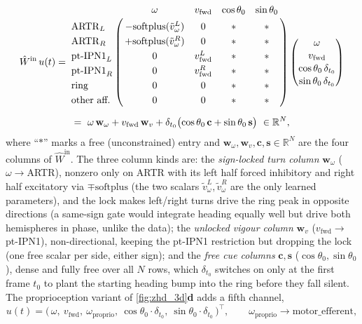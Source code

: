 \documentclass[11pt]{article}
\def\R{\mathbb{R}}
\def\softplus{\mathrm{softplus}}
\begin{document}
{\small
\begin{equation}
\begin{gathered}
\hat W^{\mathrm{in}}\,u(t)=
\bordermatrix{%
 & \omega & v_{\mathrm{fwd}} & \cos\theta_0 & \sin\theta_0 \cr
\mathrm{ARTR}_L   & -\softplus(\tilde v_\omega^{L}) & 0 & * & * \cr
\mathrm{ARTR}_R   & +\softplus(\tilde v_\omega^{R}) & 0 & * & * \cr
\text{pt-IPN1}_L  & 0 & v_{\mathrm{fwd}}^{L} & * & * \cr
\text{pt-IPN1}_R  & 0 & v_{\mathrm{fwd}}^{R} & * & * \cr
\text{ring}       & 0 & 0 & * & * \cr
\text{other aff.} & 0 & 0 & * & * \cr}
\begin{pmatrix}\omega\\[1pt] v_{\mathrm{fwd}}\\[1pt]
   \cos\theta_0\,\delta_{t_0}\\[1pt] \sin\theta_0\,\delta_{t_0}\end{pmatrix}
\\[6pt]
=\ \omega\,\mathbf{w}_\omega+v_{\mathrm{fwd}}\,\mathbf{w}_{v}
  +\delta_{t_0}\bigl(\cos\theta_0\,\mathbf{c}+\sin\theta_0\,\mathbf{s}\bigr)
  \ \in\R^{N},
\end{gathered}
\label{eq:zhd_swim_gate}
\end{equation}
}
where ``$*$'' marks a free (unconstrained) entry and
$\mathbf{w}_\omega,\mathbf{w}_{v},\mathbf{c},\mathbf{s}\in\R^{N}$ are
the four columns of $\hat W^{\mathrm{in}}$. The three column kinds are:
the \emph{sign-locked turn column} $\mathbf{w}_\omega$
($\omega\!\to\!$ARTR), nonzero only on ARTR with its left half forced
inhibitory and right half excitatory via $\mp\softplus$ (the two
scalars $\tilde v_\omega^{L},\tilde v_\omega^{R}$ are the only learned
parameters), and the lock makes left/right turns drive the ring peak in
opposite directions (a same-sign gate would integrate heading equally
well but drive both hemispheres in phase, unlike the data); the
\emph{unlocked vigour column} $\mathbf{w}_{v}$
($v_{\mathrm{fwd}}\!\to\!$pt-IPN1), non-directional, keeping the pt-IPN1
restriction but dropping the lock (one free scalar per side, either
sign); and the \emph{free cue columns} $\mathbf{c},\mathbf{s}$
($\cos\theta_0,\sin\theta_0$), dense and fully free over all $N$ rows,
which $\delta_{t_0}$ switches on only at the first frame $t_0$ to plant
the starting heading bump into the ring before they fall silent.
The proprioception variant of \cref{fig:zhd_3d}\textbf{d} adds
a fifth channel,
\begin{equation*}
u(t)=\bigl(\,\omega,\ v_{\mathrm{fwd}},\ \omega_{\mathrm{proprio}},\
   \cos\theta_0\!\cdot\!\delta_{t_0},\
   \sin\theta_0\!\cdot\!\delta_{t_0}\,\bigr)^{\!\top},\qquad
\omega_{\mathrm{proprio}}\to\mathrm{motor\_efferent},
\end{equation*}
\end{document}
